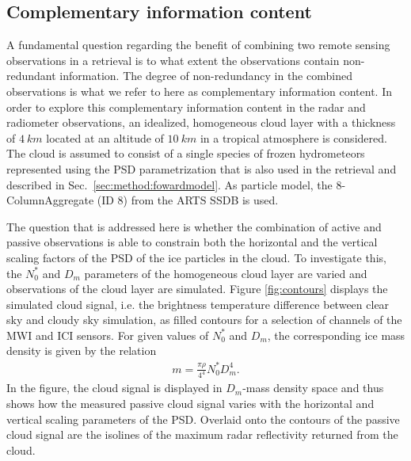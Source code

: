 \documentclass[journal abbreviation, manuscript]{copernicus}
\begin{document}
\subsection{Complementary information content}
\label{sec:simple_cloud}

A fundamental question regarding the benefit of combining two remote sensing
observations in a retrieval is to what extent the observations contain
non-redundant information. The degree of non-redundancy in the combined
observations is what we refer to here as complementary information content.
In order to explore this complementary information content in the radar and
radiometer observations, an idealized, homogeneous cloud layer with a thickness
of $4\ \unit{km}$ located at an altitude of $10\ \unit{km}$ in a tropical
atmosphere is considered. The cloud is assumed to consist of a single species of
frozen hydrometeors represented using the PSD parametrization that is also used
in the retrieval and described in Sec.~\ref{sec:method:fowardmodel}. As particle
model, the 8-ColumnAggregate (ID 8) from the ARTS SSDB is used.

The question that is addressed here is whether the combination of active
and passive observations is able to constrain both the horizontal and the
vertical scaling factors of the PSD of the ice particles in the cloud. To
investigate this, the $N_0^*$ and $D_m$ parameters of the homogeneous cloud
layer are varied and observations of the cloud layer are simulated. Figure
\ref{fig:contours} displays the simulated cloud signal, i.e. the brightness
temperature difference between clear sky and cloudy sky simulation, as filled
contours for a selection of channels of the MWI and ICI sensors. For given
values of $N_0^*$ and $D_m$, the corresponding ice mass density is given by
the relation
\begin{align}
m = \frac{\pi \rho}{4 ^ 4}N_0^* D_m^4.
\end{align}
In the figure, the cloud signal is displayed in $D_m$-mass density space and
thus shows how the measured passive cloud signal varies with the horizontal and
vertical scaling parameters of the PSD. Overlaid onto the contours of the
passive cloud signal are the isolines of the maximum radar reflectivity returned
from the cloud.
\end{document}
